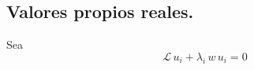 \subsection{Valores propios reales.}
Sea
\begin{equation}
\mathcal{L} \, u_{i} + \lambda_{i} \, w \, u_{i} = 0
\label{eq:ecuacion_10_29}
\end{equation}
